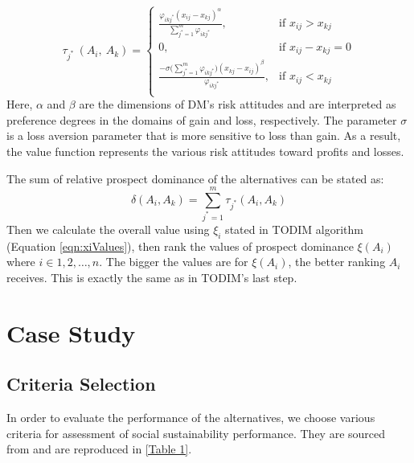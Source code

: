 \documentclass{infor}
\theoremstyle{remark}
\begin{document}
\begin{steps}
\begin{equation}\label{eqn:tauJStar}
\tau_{j^{*}}\ \left( A_{i},\ A_{k} \right) = 
\begin{cases}
\frac{\varphi_{ikj^{*}}\left( x_{ij} - x_{kj} \right)^{\alpha}}{\sum_{j^{*} = 1}^{m}{\varphi_{ikj^{*}}\ }}, & \text{if }x_{ij} > x_{kj} \\
0,  & \text{if }x_{ij} - x_{kj} = 0 \\
\frac{- \sigma(\sum_{j^{*} = 1}^{m}{\varphi_{ikj^{*}})\left( x_{kj} - x_{ij} \right)^{\beta}}}{\varphi_{ikj^{*}}},&\text{if }x_{ij} < x_{kj} \\
\end{cases}
\end{equation}
Here, \(\alpha\) and \(\beta\) are the dimensions of DM's risk attitudes and are interpreted as preference degrees in the domains of gain and loss, respectively. The parameter \(\sigma\) is a loss aversion parameter
that is more sensitive to loss than gain. As a result, the value function represents the various risk attitudes toward profits and losses.

\item The sum of relative prospect dominance of the
alternatives can be stated as:
\begin{equation}\label{eqn:deltaSumCPTTODIM}
\delta\left( A_{i},A_{k} \right) = \sum_{j^{*} = 1}^{m}{\tau_{j^{*}}(A_{i},A_{k})}
\end{equation}
Then we calculate the overall value using \(\xi_{i}\) stated in TODIM algorithm (Equation \ref{eqn:xiValues}), then rank the values of prospect dominance \(\xi\left( A_{i} \right)\) where \(i \in 1, 2, \ldots, n\). The bigger the values are for \(\xi\left( A_{i} \right)\), the better ranking \(A_{i}\) receives. This is exactly the same as in TODIM's last step.
\end{steps}

\section{Case Study}

\subsection{Criteria Selection}

In order to evaluate the performance of the alternatives, we choose various criteria for assessment of social sustainability performance. They are sourced from \cite{torkayesh2021comparative} and are reproduced in \autoref{Table 1}.
\end{document}
